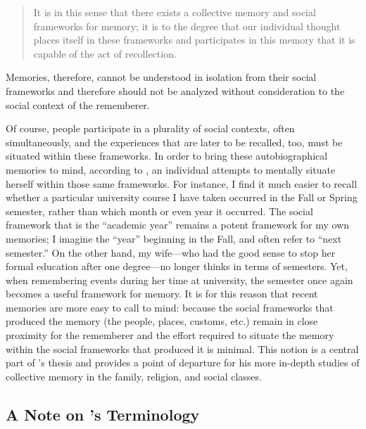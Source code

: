 \begin{quote}
    It is in this sense that there exists a collective memory and social frameworks for memory; it is to the degree that our individual thought places itself in these frameworks and participates in this memory that it is capable of the act of recollection.\autocite[38]{halbwachs1992}
\end{quote}  

Memories, therefore, cannot be understood in isolation from their social frameworks and therefore should not be analyzed without consideration to the social context of the rememberer.  

Of course, people participate in a plurality of social contexts, often simultaneously, and the experiences that are later to be recalled, too, must be situated within these frameworks. In order to bring these autobiographical memories to mind, according to \halbwachs, an individual attempts to mentally situate herself within those same frameworks.\autocite[38]{halbwachs1992} For instance, I find it much easier to recall whether a particular university course I have taken occurred in the Fall or Spring semester, rather than which month or even year it occurred. The social framework that is the ``academic year'' remains a potent framework for my own memories; I imagine the ``year'' beginning in the Fall, and often refer to ``next semester.'' On the other hand, my wife---who had the good sense to stop her formal education after one degree---no longer thinks in terms of semesters. Yet, when remembering events during her time at university, the semester once again becomes a useful framework for memory. It is for this reason that recent memories are more easy to call to mind: because the social frameworks that produced the memory (the people, places, customs, etc.) remain in close proximity for the rememberer and the effort required to situate the memory within the social frameworks that produced it is minimal.\autocite[52]{halbwachs1992} This notion is a central part of \halbwachs's thesis and provides a point of departure for his more in-depth studies of collective memory in the family, religion, and social classes.  

\subsection{A Note on \halbwachs's Terminology}

